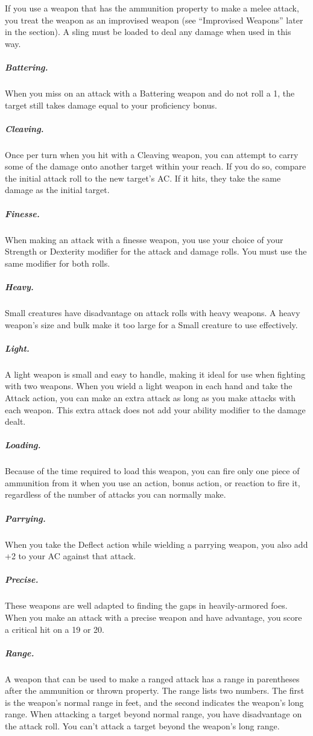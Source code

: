 If you use a weapon that has the ammunition property to make a melee attack, you treat the weapon as an improvised weapon (see “Improvised Weapons” later in the section). A sling must be loaded to deal any damage when used in this way.

\subparagraph*{Battering.} When you miss on an attack with a Battering weapon and do not roll a 1, the target still takes damage equal to your proficiency bonus.

\subparagraph*{Cleaving.} Once per turn when you hit with a Cleaving weapon, you can attempt to carry some of the damage onto another target within your reach. If you do so, compare the initial attack roll to the new target's AC. If it hits, they take the same damage as the initial target.

\subparagraph*{Finesse.} When making an attack with a finesse weapon, you use your choice of your Strength or Dexterity modifier for the attack and damage rolls. You must use the same modifier for both rolls.

\subparagraph*{Heavy.} Small creatures have disadvantage on attack rolls with heavy weapons. A heavy weapon's size and bulk make it too large for a Small creature to use effectively. 

\subparagraph*{Light.} A light weapon is small and easy to handle, making it ideal for use when fighting with two weapons. When you wield a light weapon in each hand and take the Attack action, you can make an extra attack as long as you make attacks with each weapon. This extra attack does not add your ability modifier to the damage dealt.

\subparagraph*{Loading.} Because of the time required to load this weapon, you can fire only one piece of ammunition from it when you use an action, bonus action, or reaction to fire it, regardless of the number of attacks you can normally make.

\subparagraph*{Parrying.} When you take the Deflect action while wielding a parrying weapon, you also add +2 to your AC against that attack.

\subparagraph*{Precise.} These weapons are well adapted to finding the gaps in heavily-armored foes. When you make an attack with a precise weapon and have advantage, you score a critical hit on a 19 or 20.

\subparagraph*{Range.} A weapon that can be used to make a ranged attack has a range in parentheses after the ammunition or thrown property. The range lists two numbers. The first is the weapon's normal range in feet, and the second indicates the weapon's long range. When attacking a target beyond normal range, you have disadvantage on the attack roll. You can't attack a target beyond the weapon's long range.


